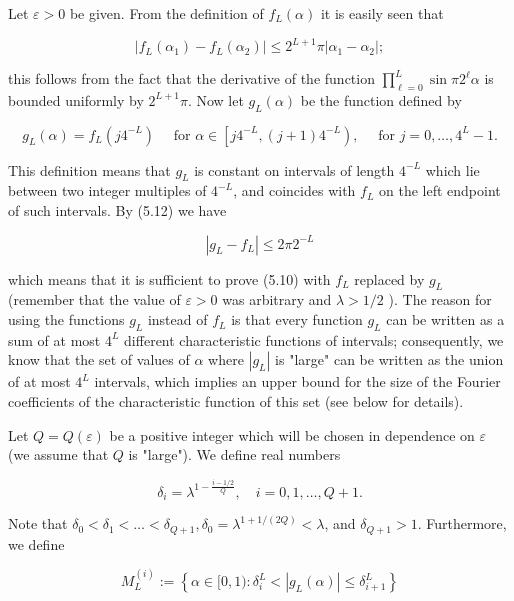 \documentclass[10pt]{article}
\newcommand{\1}{\mathbf{1}}
\begin{document}
Let $\varepsilon>0$ be given. From the definition of $f_{L}(\alpha)$ it is easily seen that


\begin{equation*}
\left|f_{L}\left(\alpha_{1}\right)-f_{L}\left(\alpha_{2}\right)\right| \leqslant 2^{L+1} \pi\left|\alpha_{1}-\alpha_{2}\right| ; \tag{5.12}
\end{equation*}


this follows from the fact that the derivative of the function $\prod_{\ell=0}^{L} \sin \pi 2^{\ell} \alpha$ is bounded uniformly by $2^{L+1} \pi$. Now let $g_{L}(\alpha)$ be the function defined by

$$
g_{L}(\alpha)=f_{L}\left(j 4^{-L}\right) \quad \text{ for } \alpha \in\left[j 4^{-L},(j+1) 4^{-L}\right), \quad \text{ for } j=0, \ldots, 4^{L}-1 .
$$

This definition means that $g_{L}$ is constant on intervals of length $4^{-L}$ which lie between two integer multiples of $4^{-L}$, and coincides with $f_{L}$ on the left endpoint of such intervals. By (5.12) we have


\begin{equation*}
\left|g_{L}-f_{L}\right| \leqslant 2 \pi 2^{-L} \tag{5.13}
\end{equation*}


which means that it is sufficient to prove (5.10) with $f_{L}$ replaced by $g_{L}$ (remember that the value of $\varepsilon>0$ was arbitrary and $\lambda>1 / 2$ ). The reason for using the functions $g_{L}$ instead of $f_{L}$ is that every function $g_{L}$ can be written as a sum of at most $4^{L}$ different characteristic functions of intervals; consequently, we know that the set of values of $\alpha$ where $\left|g_{L}\right|$ is "large" can be written as the union of at most $4^{L}$ intervals, which implies an upper bound for the size of the Fourier coefficients of the characteristic function of this set (see below for details).

Let $Q=Q(\varepsilon)$ be a positive integer which will be chosen in dependence on $\varepsilon$ (we assume that $Q$ is "large"). We define real numbers

$$
\delta_{i}=\lambda^{1-\frac{i-1 / 2}{Q}}, \quad i=0,1, \ldots, Q+1 .
$$

Note that $\delta_{0}<\delta_{1}<\ldots<\delta_{Q+1}, \delta_{0}=\lambda^{1+1 /(2 Q)}<\lambda$, and $\delta_{Q+1}>1$. Furthermore, we define

$$
M_{L}^{(i)}:=\left\{\alpha \in[0,1): \delta_{i}^{L}<\left|g_{L}(\alpha)\right| \leqslant \delta_{i+1}^{L}\right\}
$$
\end{document}
